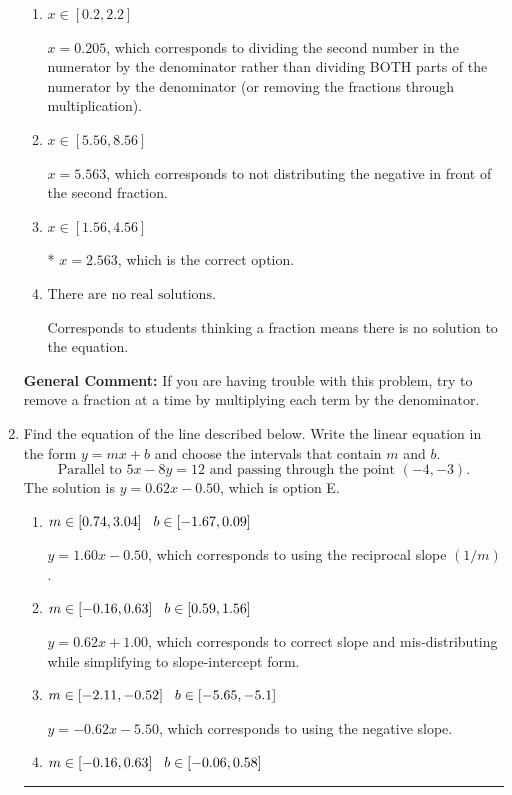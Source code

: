 \documentclass{extbook}[14pt]
\newcommand{\litem}[1]{\item #1

\rule{\textwidth}{0.4pt}}
\begin{document}
\begin{enumerate}
{\begin{enumerate}[label=\Alph*.]
 $x = 17.500$, which corresponds to dividing the coefficients in front of x by the denominator rather than dividing BOTH parts of the numerator by the denominator (or removing the fractions through multiplication).
\item \( x \in [0.2, 2.2] \)

 $x = 0.205$, which corresponds to dividing the second number in the numerator by the denominator rather than dividing BOTH parts of the numerator by the denominator (or removing the fractions through multiplication).
\item \( x \in [5.56, 8.56] \)

 $x = 5.563$, which corresponds to not distributing the negative in front of the second fraction.
\item \( x \in [1.56, 4.56] \)

* $x = 2.563$, which is the correct option.
\item \( \text{There are no real solutions.} \)

Corresponds to students thinking a fraction means there is no solution to the equation.
\end{enumerate}

\textbf{General Comment:} If you are having trouble with this problem, try to remove a fraction at a time by multiplying each term by the denominator.
}
\litem{
Find the equation of the line described below. Write the linear equation in the form $ y=mx+b $ and choose the intervals that contain $m$ and $b$.
\[ \text{Parallel to } 5 x - 8 y = 12 \text{ and passing through the point } (-4, -3). \]The solution is \( y = 0.62x - 0.50 \), which is option E.\begin{enumerate}[label=\Alph*.]
\item \( m \in [0.74, 3.04] \hspace*{3mm} b \in [-1.67, 0.09] \)

 $y = 1.60x - 0.50$, which corresponds to using the reciprocal slope $(1/m)$.
\item \( m \in [-0.16, 0.63] \hspace*{3mm} b \in [0.59, 1.56] \)

 $y = 0.62x + 1.00$, which corresponds to correct slope and mis-distributing while simplifying to slope-intercept form.
\item \( m \in [-2.11, -0.52] \hspace*{3mm} b \in [-5.65, -5.1] \)

 $y = -0.62x - 5.50$, which corresponds to using the negative slope.
\item \( m \in [-0.16, 0.63] \hspace*{3mm} b \in [-0.06, 0.58] \)


\end{enumerate}}
\end{enumerate}
\end{document}
